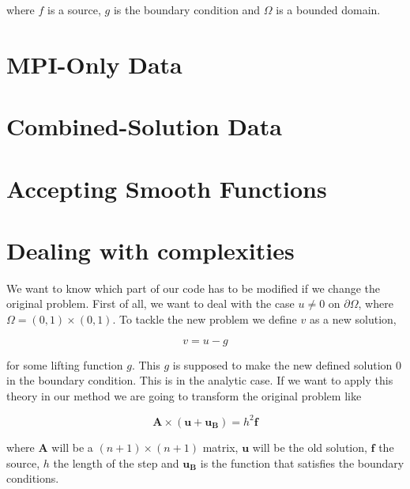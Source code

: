 \documentclass[fontsize=11pt,paper=a4,titlepage]{report}
\begin{document}
where $f$ is a source, $g$ is the boundary condition and $\Omega$ is a bounded 
domain.


\section{MPI-Only Data}

\section{Combined-Solution Data}

\section{Accepting Smooth Functions}


\section{Dealing with complexities}


We want to know which part of our code has to be modified if we change the 
original problem. First of all, we want to deal with the case $u \neq 0$ on 
$\partial\Omega$, where $\Omega = (0,1) \times (0,1)$. To tackle the new problem
we define $v$ as a new solution,

\begin{equation}
	v = u - g
\end{equation}

for some lifting function $g$. This $g$ is supposed to make the new defined 
solution $0$ in the boundary condition.
This is in the analytic case. If we want to apply this theory in our method we
are going to transform the original problem like

\begin{displaymath}
	\mathbf{A} \times (\mathbf{u} + \mathbf{u_B}) = h^2 \mathbf{f}
\end{displaymath}

where $\mathbf{A}$ will be a $(n + 1) \times (n + 1)$ matrix, $\mathbf{u}$ will 
be the old solution, $\mathbf{f}$ the source, $h$ the length of the step and 
$\mathbf{u_B}$ is the function that satisfies the boundary conditions.
\end{document}
